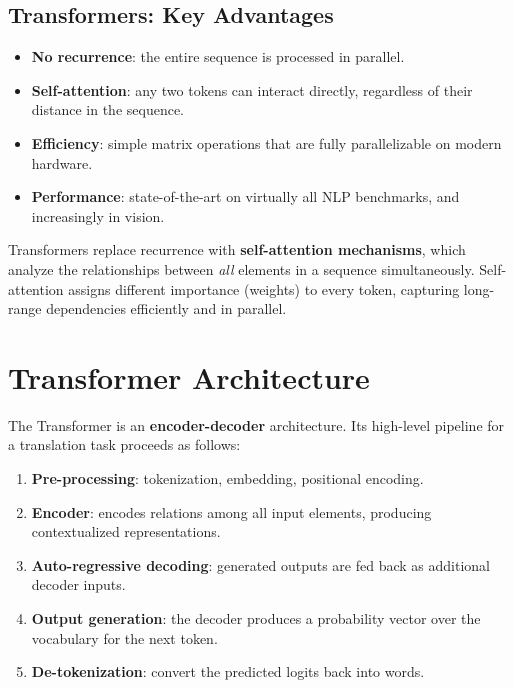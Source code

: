 \documentclass[11pt,a4paper]{article}
\theoremstyle{definition}
\theoremstyle{plain}
\theoremstyle{remark}
\begin{document}
\subsection{Transformers: Key Advantages}

\begin{itemize}
    \item \textbf{No recurrence}: the entire sequence is processed in parallel.
    \item \textbf{Self-attention}: any two tokens can interact directly, regardless of their distance in the sequence.
    \item \textbf{Efficiency}: simple matrix operations that are fully parallelizable on modern hardware.
    \item \textbf{Performance}: state-of-the-art on virtually all NLP benchmarks, and increasingly in vision.
\end{itemize}

\begin{tcolorbox}[colback=green!5!white,colframe=green!60!black,title=\textbf{Core Idea}]
Transformers replace recurrence with \textbf{self-attention mechanisms}, which analyze the relationships between \emph{all} elements in a sequence simultaneously. Self-attention assigns different importance (weights) to every token, capturing long-range dependencies efficiently and in parallel.
\end{tcolorbox}


\section{Transformer Architecture}

The Transformer is an \textbf{encoder-decoder} architecture. Its high-level pipeline for a translation task proceeds as follows:

\begin{enumerate}
    \item \textbf{Pre-processing}: tokenization, embedding, positional encoding.
    \item \textbf{Encoder}: encodes relations among all input elements, producing contextualized representations.
    \item \textbf{Auto-regressive decoding}: generated outputs are fed back as additional decoder inputs.
    \item \textbf{Output generation}: the decoder produces a probability vector over the vocabulary for the next token.
    \item \textbf{De-tokenization}: convert the predicted logits back into words.
\end{enumerate}
\end{document}
